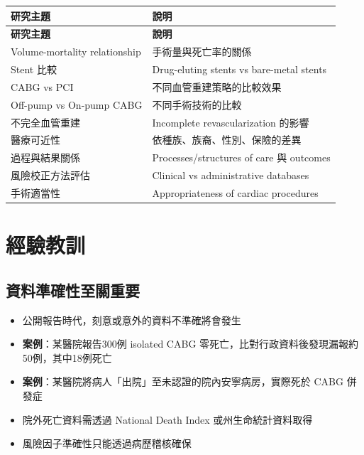 \documentclass[12pt,a4paper]{article}
\begin{document}
\begin{longtable}{p{5cm}p{9cm}}
\toprule
\textbf{研究主題} & \textbf{說明} \\
\midrule
\endfirsthead

\toprule
\textbf{研究主題} & \textbf{說明} \\
\midrule
\endhead

\bottomrule
\endfoot

Volume-mortality relationship & 手術量與死亡率的關係 \\
\midrule
Stent 比較 & Drug-eluting stents vs bare-metal stents \\
\midrule
CABG vs PCI & 不同血管重建策略的比較效果 \\
\midrule
Off-pump vs On-pump CABG & 不同手術技術的比較 \\
\midrule
不完全血管重建 & Incomplete revascularization 的影響 \\
\midrule
醫療可近性 & 依種族、族裔、性別、保險的差異 \\
\midrule
過程與結果關係 & Processes/structures of care 與 outcomes \\
\midrule
風險校正方法評估 & Clinical vs administrative databases \\
\midrule
手術適當性 & Appropriateness of cardiac procedures \\
\bottomrule
\end{longtable}

\section{經驗教訓}


\subsection{資料準確性至關重要}

\begin{itemize}
    \item 公開報告時代，刻意或意外的資料不準確將會發生
    \item \textbf{案例}：某醫院報告300例 isolated CABG 零死亡，比對行政資料後發現漏報約50例，其中18例死亡
    \item \textbf{案例}：某醫院將病人「出院」至未認證的院內安寧病房，實際死於 CABG 併發症
    \item 院外死亡資料需透過 National Death Index 或州生命統計資料取得
    \item 風險因子準確性只能透過病歷稽核確保
\end{itemize}
\end{document}
